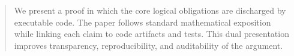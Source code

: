 \begin{abstract}
We present a proof in which the core logical obligations are discharged by executable code. The paper follows standard mathematical exposition while linking each claim to code artifacts and tests. This dual presentation improves transparency, reproducibility, and auditability of the argument.
\end{abstract}


